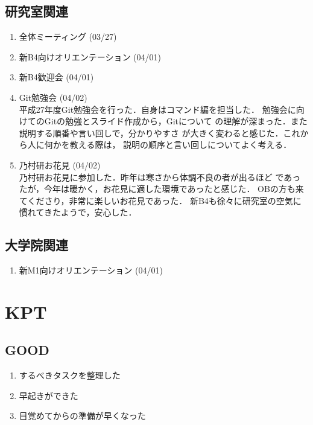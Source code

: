 \documentclass[fleqn, 12pt]{extarticlej}
\begin{document}
  \subsection{研究室関連}
  \begin{enumerate}
   \item 全体ミーティング
         \hfill
         (03/27)
   \item 新B4向けオリエンテーション
         \hfill
         (04/01)
     \item 新B4歓迎会
         \hfill
         (04/01)
     \item Git勉強会
         \hfill
         (04/02)\\
         平成27年度Git勉強会を行った．自身はコマンド編を担当した．
         勉強会に向けてのGitの勉強とスライド作成から，Gitについて
         の理解が深まった．また説明する順番や言い回しで，分かりやすさ
         が大きく変わると感じた．これから人に何かを教える際は，
         説明の順序と言い回しについてよく考える．
     \item 乃村研お花見
         \hfill
         (04/02)\\
         乃村研お花見に参加した．昨年は寒さから体調不良の者が出るほど
         であったが，今年は暖かく，お花見に適した環境であったと感じた．
         OBの方も来てくださり，非常に楽しいお花見であった．
         新B4も徐々に研究室の空気に慣れてきたようで，安心した．

  \end{enumerate}

  \subsection{大学院関連}
  \begin{enumerate}
   \item 新M1向けオリエンテーション
         \hfill
         (04/01)
  \end{enumerate}

\section{KPT}
  \subsection{GOOD}
  \begin{enumerate}
   \item するべきタスクを整理した
   \item 早起きができた
   \item 目覚めてからの準備が早くなった
  \end{enumerate}
\end{document}
